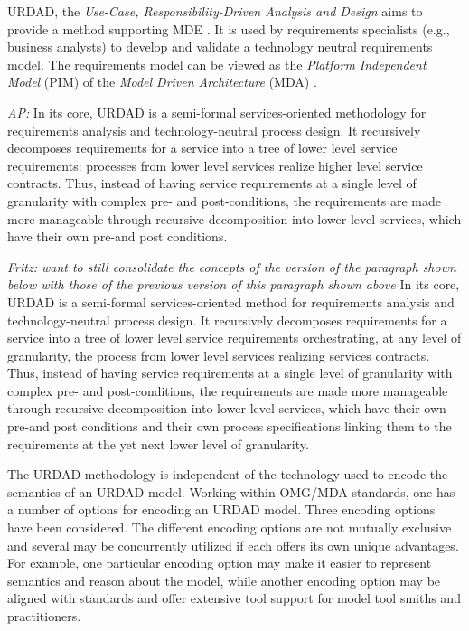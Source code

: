 URDAD, the {\em Use-Case, Responsibility-Driven Analysis and Design} \cite{fritz_solms_technology_2007} aims to provide a method supporting MDE \cite{solms_urdad_2010}. It is used by requirements specialists (e.g., business analysts) to develop and validate a technology neutral requirements model. The requirements model can be viewed as the {\em Platform Independent Model} (PIM) of the {\em Model Driven Architecture} (MDA) \cite{solms_urdad_2010}.

\emph{AP:}
In its core, URDAD is a semi-formal services-oriented methodology for requirements analysis and technology-neutral process design. It recursively decomposes requirements for a service into a tree of lower level service requirements: processes from lower level services realize higher level service contracts. Thus, instead of having service requirements at a single level of granularity with complex pre- and post-conditions, the requirements are made more manageable through recursive decomposition into lower level services, which have their own pre-and post conditions.

\emph{Fritz: want to still consolidate the concepts of the version of the paragraph shown below with those of the previous version of this paragraph shown above}
In its core, URDAD is a semi-formal services-oriented method for requirements analysis and technology-neutral process design. It recursively decomposes requirements for a service into a tree of lower level service requirements orchestrating, at any level of granularity, the process from lower level services realizing services contracts. Thus, instead of having service requirements at a single level of granularity with complex pre- and post-conditions, the requirements are made more manageable through recursive decomposition into lower level services, which have their own pre-and post conditions and their own process specifications linking them to the requirements at the yet next lower level of granularity.

The URDAD methodology is independent of the technology used to encode the semantics of an URDAD model. Working within OMG/MDA standards, one has a number of options for encoding an URDAD model. Three encoding options have been considered. The different encoding options are not mutually exclusive and several may be concurrently utilized if each offers its own unique advantages. For example, one particular encoding option may make it easier to represent semantics and reason about the model, while another encoding option may be aligned with standards and offer extensive tool support for model tool smiths and practitioners. 

